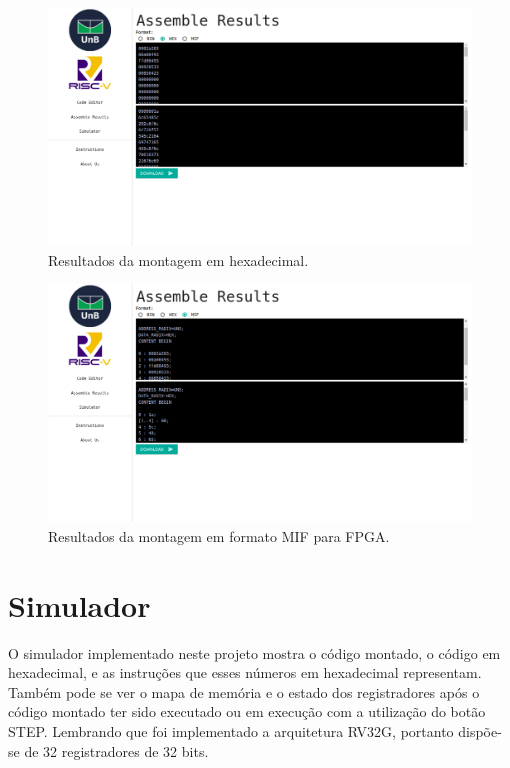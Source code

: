 	\begin{figure}[h]
	  \includegraphics[width=\linewidth]{img/assemble_data_hex.png}
	  \caption{Resultados da montagem em hexadecimal.}
	  \label{fig:assemble_data_hex}
	\end{figure}

	\begin{figure}[h]
	  \includegraphics[width=\linewidth]{img/assemble_data_mif.png}
	  \caption{Resultados da montagem em formato MIF para FPGA.}
	  \label{fig:assemble_data_mif}
	\end{figure}



\section{Simulador}

	O simulador implementado neste projeto mostra o código montado, o código em hexadecimal, e as instruções que esses números em hexadecimal representam. Também pode se ver o mapa de memória e o estado dos registradores após o código montado ter sido executado ou em execução com a utilização do botão STEP.  Lembrando que foi implementado a arquitetura RV32G, portanto dispõe-se de 32 registradores de 32 bits.

